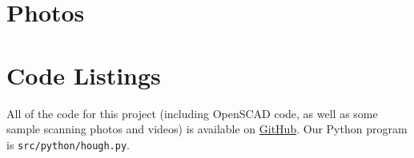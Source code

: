 \documentclass[12pt, letterpaper]{article}
\begin{document}
\appendix
\section{Photos}

\section{Code Listings}
All of the code for this project (including OpenSCAD code, as well as some sample
scanning photos and videos) is available on
\href{https://github.com/nhalford/3d-scanner/}{GitHub}. Our Python program is
\texttt{src/python/hough.py}.
\end{document}

